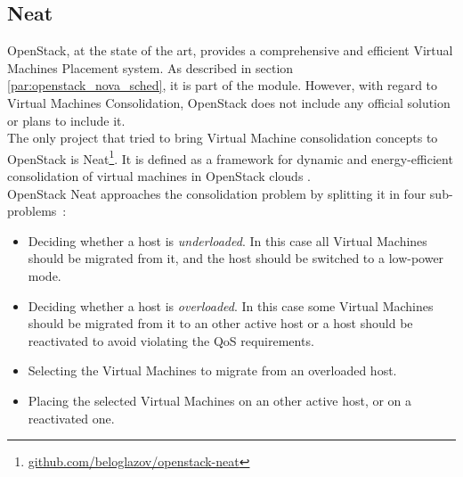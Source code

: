 \subsection{Neat}
\label{sec:sota_neat}
OpenStack, at the state of the art, provides a comprehensive and efficient Virtual Machines Placement system. As described in section \ref{par:openstack_nova_sched}, it is part of the  module. However, with regard to Virtual Machines Consolidation, OpenStack does not include any official solution or plans to include it.\\
The only project that tried to bring Virtual Machine consolidation concepts to OpenStack is Neat\footnote{\url{github.com/beloglazov/openstack-neat}}. It is defined as a framework for dynamic and energy-efficient consolidation of virtual machines in OpenStack clouds \cite{beloglazov2014openstack}.\\
OpenStack Neat approaches the consolidation problem by splitting it in four sub-problems~\cite[p.~3]{beloglazov2014openstack}:
\begin{itemize}
  \item  Deciding whether a host is \textit{underloaded}. In this case all Virtual Machines should be migrated from it, and the host should be switched to a low-power mode. 
  \item Deciding whether a host is \textit{overloaded}. In this case some Virtual Machines should be migrated from it to an other active host or a host should be reactivated to avoid violating the QoS requirements.
  \item Selecting the Virtual Machines to migrate from an overloaded host.
  \item Placing the selected Virtual Machines on an other active host, or on a reactivated one.
\end{itemize}

